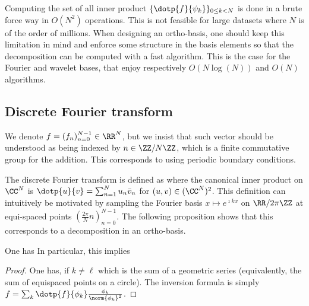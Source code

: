 Computing the set of all inner product $\{\dotp{f}{\psi_k}\}_{0 \leq k < N}$ is done in a brute force way in $O(N^2)$ operations.
This is not feasible for large datasets where $N$ is of the order of millions. When designing an ortho-basis, one should keep this limitation in mind and enforce some structure in the basis elements so that the decomposition can be computed with a fast algorithm. This is the case for the Fourier and wavelet bases, that enjoy respectively $O(N\log(N))$ and $O(N)$ algorithms.


\subsection{Discrete Fourier transform}

We denote $f = (f_n)_{n=0}^{N-1} \in \RR^N$, but we insist that such vector should be understood as being indexed by $n \in \ZZ/N\ZZ$, which is a finite commutative group for the addition. This corresponds to using periodic boundary conditions. 

The discrete Fourier transform is defined as
where the canonical inner product on $\CC^N$ is $\dotp{u}{v}=\sum_{n=1}^N u_n \bar v_n$ for $(u,v) \in (\CC^N)^2$.
%
This definition can intuitively be motivated by sampling the Fourier basis $x \mapsto e^{\imath k x}$ on $\RR/2\pi\ZZ$ at equi-spaced points $( \frac{2\pi}{N}n )_{n=0}^{N-1}$.
%
The following proposition shows that this corresponds to a decomposition in an ortho-basis.

\begin{prop}
	One has
	In particular, this implies
\end{prop}
\begin{proof}
	One has, if $k \neq \ell$
	which is the sum of a geometric series (equivalently, the sum of equispaced points on a circle). 
	The inversion formula is simply $f = \sum_k \dotp{f}{\phi_k} \frac{\phi_k}{\norm{\phi_k}^2}$.
\end{proof}


